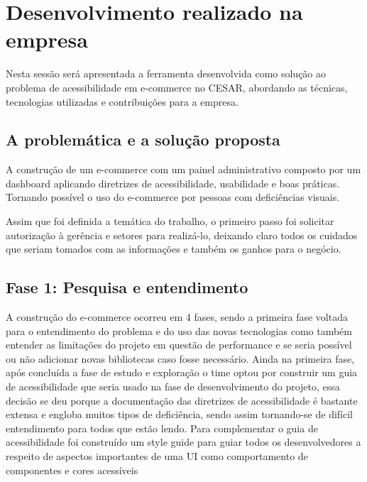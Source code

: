 \section{Desenvolvimento realizado na empresa}
\label{sec:desenvolvimento}

{Nesta sessão será apresentada a ferramenta desenvolvida como solução ao problema de acessibilidade em e-commerce no CESAR, abordando as técnicas, tecnologias utilizadas e contribuições para a empresa.}

\subsection{A problemática e a solução proposta}
{A construção de um e-commerce com um painel administrativo composto por um dashboard aplicando diretrizes de acessibilidade, usabilidade e boas práticas. Tornando possível o uso do e-commerce por pessoas com deficiências visuais. 

Assim que foi definida a temática do trabalho, o primeiro passo foi solicitar autorização à gerência e setores para realizá-lo, deixando claro todos os cuidados que seriam tomados com as informações e também os ganhos para o negócio.}

\subsection{Fase 1: Pesquisa e entendimento}
{A construção do e-commerce ocorreu em 4 fases, sendo a primeira fase voltada para o entendimento do problema e do uso das novas tecnologias como também entender as limitações do projeto em questão de performance e se seria possível ou não adicionar novas bibliotecas caso fosse necessário. Ainda na primeira fase, após concluída a fase de estudo e exploração o time optou por construir um guia de acessibilidade que seria usado na fase de desenvolvimento do projeto, essa decisão se deu porque a documentação das diretrizes de acessibilidade é bastante extensa e engloba muitos tipos de deficiência, sendo assim tornando-se de difícil entendimento para todos que estão lendo. Para complementar o guia de acessibilidade foi construído um style guide para guiar todos os desenvolvedores a respeito de aspectos importantes de uma UI como  comportamento de componentes e cores acessíveis}

